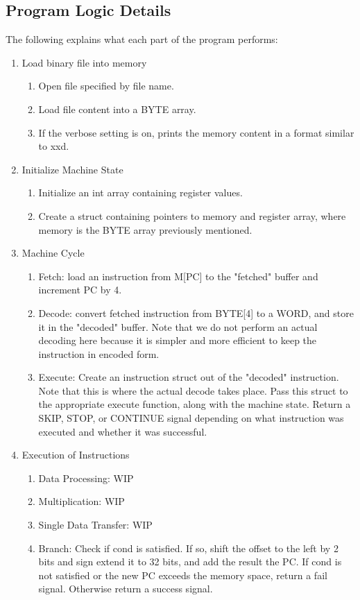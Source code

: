 \documentclass[11pt]{article}
\begin{document}
\subsection{Program Logic Details}
The following explains what each part of the program performs:
\begin{enumerate}
    \item Load binary file into memory
    \begin{enumerate}
        \item Open file specified by file name.
        \item Load file content into a BYTE array.
        \item If the verbose setting is on, prints the memory content
        in a format similar to xxd.
    \end{enumerate}
    \item Initialize Machine State
    \begin{enumerate}
        \item Initialize an int array containing register values.
        \item Create a struct containing pointers to memory and register array,
        where memory is the BYTE array previously mentioned.
    \end{enumerate}
    \item Machine Cycle
    \begin{enumerate}
        \item Fetch: load an instruction from M[PC] to the "fetched" buffer
        and increment PC by 4.
        \item Decode: convert fetched instruction from BYTE[4] to a WORD,
        and store it in the "decoded" buffer. Note that we do not perform an
        actual decoding here because it is simpler and more efficient to keep
        the instruction in encoded form.
        \item Execute: Create an instruction struct out of the "decoded"
        instruction. Note that this is where the actual decode takes place.
        Pass this struct to the appropriate execute function, along with the
        machine state. Return a SKIP, STOP, or CONTINUE signal depending on
        what instruction was executed and whether it was successful.
    \end{enumerate}
    \item Execution of Instructions
    \begin{enumerate}
        \item Data Processing: WIP
        \item Multiplication: WIP
        \item Single Data Transfer: WIP
        \item Branch: Check if cond is satisfied. If so, shift the offset to
        the left by 2 bits and sign extend it to 32 bits, and add the result
        the PC. If cond is not satisfied or the new PC exceeds the memory space,
        return a fail signal. Otherwise return a success signal.
    \end{enumerate}
\end{enumerate}
\end{document}
